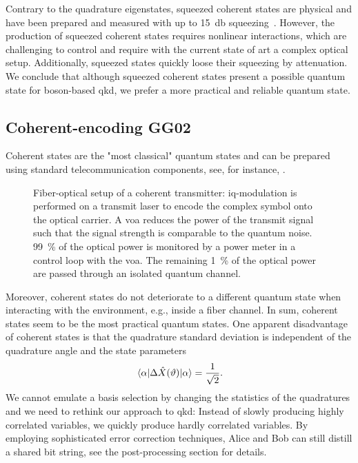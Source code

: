 Contrary to the quadrature eigenstates, squeezed coherent states are physical and have been prepared and measured with up to \SI{15}{\decibel} squeezing~\cite{Vahlbruch2016}.
However, the production of squeezed coherent states requires nonlinear interactions, which are challenging to control and require with the current state of art a complex optical setup.
Additionally, squeezed states quickly loose their squeezing by attenuation.
We conclude that although squeezed coherent states present a possible quantum state for boson-based \gls{qkd}, we prefer a more practical and reliable quantum state.

\FloatBarrier
\subsection{Coherent-encoding GG02}

Coherent states are the "most classical" quantum states and can be prepared using standard telecommunication components, see, for instance, .
\begin{figure}[htb]
	\centering
	
	\caption{Fiber-optical setup of a coherent transmitter: \gls{iq}-modulation is performed on a transmit laser to encode the complex symbol onto the optical carrier. A \gls{voa} reduces the power of the transmit signal such that the signal strength is comparable to the quantum noise. \SI{99}{\percent} of the optical power is monitored by a power meter in a control loop with the \gls{voa}. The remaining \SI{1}{\percent} of the optical power are passed through an isolated quantum channel.}\label{fig:coherent_transmitter}
\end{figure}
Moreover, coherent states do not deteriorate to a different quantum state when interacting with the environment, e.g., inside a fiber channel.
In sum, coherent states seem to be the most practical quantum states.
One apparent disadvantage of coherent states is that the quadrature standard deviation is independent of the quadrature angle and the state parameters~\cite[p.~59]{Barnett2002}
\begin{equation}
	\expval{\Delta\hat{X}(\vartheta)}{\alpha}
	=
	\frac{1}{\sqrt{2}}
	.
\end{equation}
We cannot emulate a basis selection by changing the statistics of the quadratures and we need to rethink our approach to \gls{qkd}:
Instead of slowly producing highly correlated variables, we quickly produce hardly correlated variables.
By employing sophisticated error correction techniques, Alice and Bob can still distill a shared bit string, see the post-processing section for details.


